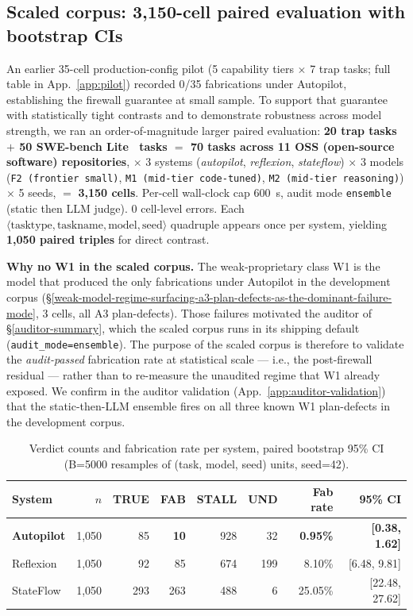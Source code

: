 \subsection{Scaled corpus: 3{,}150-cell paired evaluation with bootstrap CIs}\label{scaled-corpus}

An earlier 35-cell production-config pilot (5 capability tiers $\times$ 7 trap tasks; full table in
App.~\ref{app:pilot}) recorded 0/35 fabrications under Autopilot, establishing the firewall guarantee
at small sample. To support that guarantee with statistically tight contrasts and to demonstrate
robustness across model strength, we ran an order-of-magnitude larger paired evaluation:
\textbf{20 trap tasks $+$ 50 SWE-bench Lite~\citep{jimenez2024swebench} tasks $=$ 70 tasks across 11 OSS (open-source software) repositories}, $\times$ 3 systems
(\textit{autopilot}, \textit{reflexion}, \textit{stateflow}) $\times$ 3 models
(\texttt{F2 (frontier small)}, \texttt{M1 (mid-tier code-tuned)},
\texttt{M2 (mid-tier reasoning)}) $\times$ 5 seeds, $=$ \textbf{3{,}150 cells}. Per-cell
wall-clock cap 600~s, audit mode \texttt{ensemble} (static then LLM judge).
0 cell-level errors. Each
$\langle \text{tasktype}, \text{taskname}, \text{model}, \text{seed} \rangle$ quadruple
appears once per system, yielding \textbf{1{,}050 paired triples} for direct contrast.

\textbf{Why no W1 in the scaled corpus.} The weak-proprietary class W1 is the model
that produced the only fabrications under Autopilot in the development corpus
(\S\ref{weak-model-regime-surfacing-a3-plan-defects-as-the-dominant-failure-mode}, 3 cells, all
A3 plan-defects). Those failures motivated the auditor of \S\ref{auditor-summary},
which the scaled corpus runs in its shipping default (\texttt{audit\_mode=ensemble}). The
purpose of the scaled corpus is therefore to validate the \emph{audit-passed} fabrication
rate at statistical scale --- i.e., the post-firewall residual --- rather than to re-measure
the unaudited regime that W1 already exposed. We confirm in the auditor validation
(App.~\ref{app:auditor-validation}) that the static-then-LLM ensemble fires on all three
known W1 plan-defects in the development corpus.

\begin{longtable}[]{@{}lrrrrrrr@{}}
\caption{Verdict counts and fabrication rate per system, paired bootstrap 95\% CI
(B=5000 resamples of (task, model, seed) units, seed=42).}\label{tab:scaled-headline}\\
\toprule\noalign{}
System & $n$ & TRUE & FAB & STALL & UND & Fab rate & 95\% CI \\
\midrule\noalign{}
\endhead
\bottomrule\noalign{}
\endlastfoot
\textbf{Autopilot} & 1{,}050 &  85 & \textbf{10}  & 928 &  32 & \textbf{0.95\%} & \textbf{[0.38, 1.62]} \\
Reflexion          & 1{,}050 &  92 &          85  & 674 & 199 &          8.10\% & [6.48, 9.81]          \\
StateFlow          & 1{,}050 & 293 &         263  & 488 &   6 &         25.05\% & [22.48, 27.62]        \\
\end{longtable}

